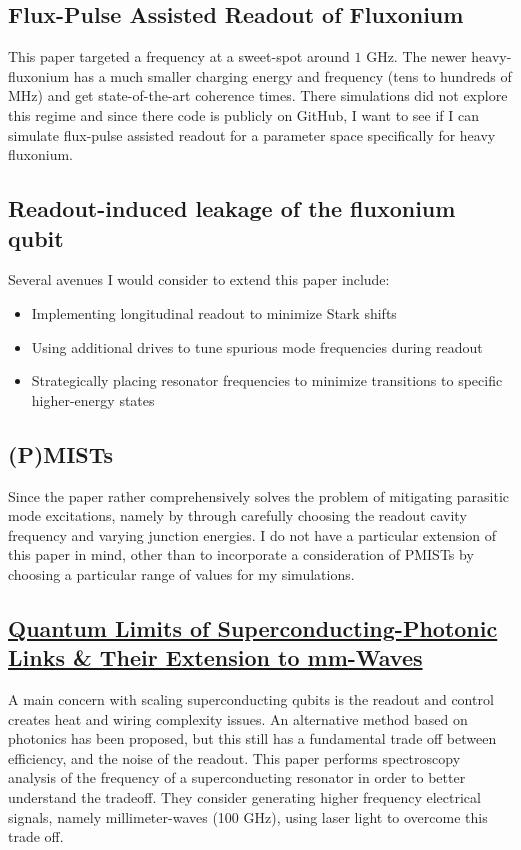 \documentclass[
 reprint,
 superscriptaddress,
 bibnotes,
 amsmath,
 amssymb,
 aps,
 prb,
 citeautoscript,
 floatfix,
]{revtex4-2}
\begin{document}
\subsection{Flux-Pulse Assisted Readout of Fluxonium}

This paper targeted a frequency at a sweet-spot around $1$ GHz. The newer heavy-fluxonium has a much smaller charging energy and frequency (tens to hundreds of MHz) and get state-of-the-art coherence times. There simulations did not explore this regime and since there code is publicly on GitHub, I want to see if I can simulate flux-pulse assisted readout for a parameter space specifically for heavy fluxonium. 

\subsection{Readout-induced leakage of the fluxonium qubit}


Several avenues I would consider to extend this paper include:
\begin{itemize}
    \item Implementing longitudinal readout to minimize Stark shifts
    \item Using additional drives to tune spurious mode frequencies during readout
    \item Strategically placing resonator frequencies to minimize transitions to specific higher-energy states
\end{itemize}


\subsection{(P)MISTs}
Since the paper rather comprehensively solves the problem of mitigating parasitic mode excitations, namely by through carefully choosing the readout cavity frequency and varying junction energies. I do not have a particular extension of this paper in mind, other than to incorporate a consideration of PMISTs by choosing a particular range of values for my simulations. 


\subsection{\href{https://arxiv.org/abs/2406.14501}{Quantum Limits of Superconducting-Photonic Links \& Their Extension to mm-Waves}}

    A main concern with scaling superconducting qubits is the readout and control creates heat and wiring complexity issues. An alternative method based on photonics has been proposed, but this still has a fundamental trade off between efficiency, and the noise of the readout. This paper performs spectroscopy analysis of the frequency of a superconducting resonator in order to better understand the tradeoff. They consider generating higher frequency electrical signals, namely millimeter-waves (100 GHz), using laser light to overcome this trade off. 
\end{document}
